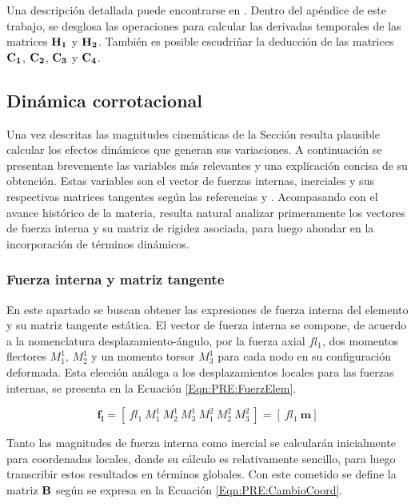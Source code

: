 Una descripción detallada puede encontrarse en \cite{Le2014}. Dentro del apéndice de este trabajo, se desglosa las operaciones para calcular las derivadas temporales de las matrices $\bf{H}_1$ y $\bf{H}_2$. También es posible escudriñar la deducción de las matrices $\bf{C_1}$, $\bf{C_2}$, $\bf{C_3}$ y $\bf{C_4}$.   

\subsection{Dinámica corrotacional}\label{Subsec:PRE:DinamicCorrot}

Una vez descritas las magnitudes cinemáticas de la Sección \label{Subsec:PRE:CinematicCorrot} resulta plausible calcular los efectos dinámicos que generan sus variaciones. A continuación se presentan brevemente las variables más relevantes y una explicación concisa de su obtención. Estas
variables son el vector de fuerzas internas, inerciales y sus respectivas matrices tangentes según las referencias \citep{Le2014} y \citep{battini2002co}. Acompasando con el avance histórico de la materia, resulta natural analizar primeramente los vectores de fuerza interna y su matriz de rigidez asociada, para luego ahondar en la incorporación de términos dinámicos. 


\subsubsection{Fuerza interna y matriz tangente}\label{Sec:PRE:Interna}

En este apartado se buscan obtener las expresiones de fuerza interna del elemento y su matriz tangente estática. El vector de fuerza interna se compone, de acuerdo a la nomenclatura desplazamiento-ángulo, por la fuerza axial $fl_1$, dos momentos flectores $M^1_1$, $M^1_2$ y un momento torsor $M^1_3$ para cada nodo en su configuración deformada. Esta elección análoga a los desplazamientos locales para las fuerzas internas, se presenta en la Ecuación \eqref{Eqn:PRE:FuerzElem}. 

\begin{equation}\label{Eqn:PRE:FuerzElem}
\boldsymbol{f_l} =[~fl_1 ~M^1_1~ M^1_2~ M^1_3~ M^2_1~ M^2_2~ M^2_3~] = [~fl_1~\boldsymbol{m}]
\end{equation}

Tanto las magnitudes de fuerza interna como inercial se calcularán inicialmente para coordenadas locales, donde su cálculo es relativamente sencillo, para luego transcribir estos resultados en términos globales. Con este cometido se define la matriz $\bf{B}$ según se expresa en la Ecuación \eqref{Eqn:PRE:CambioCoord}. 

